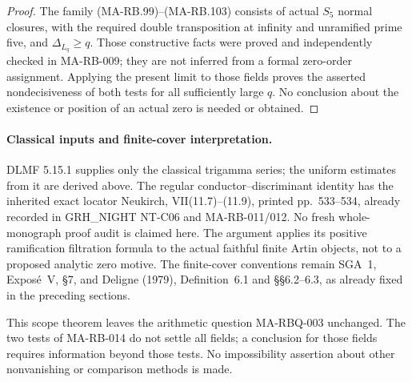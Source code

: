 \begin{proof}
The family (MA-RB.99)--(MA-RB.103) consists of actual
\(S_5\) normal closures, with the required double
transposition at infinity and unramified prime five,
and \(\Delta_{L_q}\ge q\). Those constructive facts
were proved and independently checked in MA-RB-009;
they are not inferred from a formal zero-order assignment.
Applying the present limit to those fields proves the
asserted nondecisiveness of both tests for all sufficiently
large \(q\). No conclusion about the existence or position
of an actual zero is needed or obtained.
\end{proof}

\paragraph{Classical inputs and finite-cover interpretation.}
DLMF 5.15.1 supplies only the classical trigamma series;
the uniform estimates from it are derived above. The
regular conductor--discriminant identity has the inherited
exact locator Neukirch, VII(11.7)--(11.9), printed
pp.~533--534, already recorded in GRH\_NIGHT NT-C06 and
MA-RB-011/012. No fresh whole-monograph proof audit is
claimed here. The argument applies its positive ramification
filtration formula to the actual faithful finite Artin objects,
not to a proposed analytic zero motive. The finite-cover
conventions remain SGA~1, Expos\'e~V, \S7, and Deligne
(1979), Definition~6.1 and \S\S6.2--6.3, as already fixed
in the preceding sections.

This scope theorem leaves the arithmetic question
MA-RBQ-003 unchanged. The two tests of MA-RB-014 do not
settle all fields; a conclusion for those fields requires
information beyond those tests. No impossibility assertion
about other nonvanishing or comparison methods is made.
